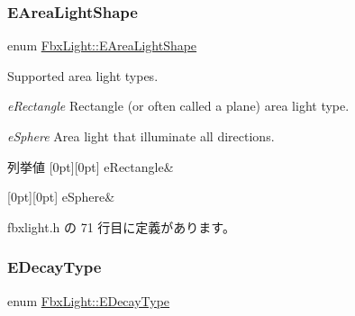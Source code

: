 \subsubsection{\texorpdfstring{E\+Area\+Light\+Shape}{EAreaLightShape}}
{\footnotesize\ttfamily enum \hyperlink{class_fbx_light_a9bc60eabc41255f46f35d1f6acd274cd}{Fbx\+Light\+::\+E\+Area\+Light\+Shape}}

Supported area light types.
\begin{DoxyItemize}
\item {\itshape e\+Rectangle} Rectangle (or often called a plane) area light type.
\item {\itshape e\+Sphere} Area light that illuminate all directions. 
\end{DoxyItemize}\begin{DoxyEnumFields}{列挙値}
[0pt][0pt]{}\mbox{\label{class_fbx_light_a9bc60eabc41255f46f35d1f6acd274cda3ad60ea65faa6a6b1c0a81c5cb014ec9}} 
e\+Rectangle&\\
\hline

[0pt][0pt]{}\mbox{\label{class_fbx_light_a9bc60eabc41255f46f35d1f6acd274cda2e2d016a7ad503ff88a90cc12ded0347}} 
e\+Sphere&\\
\hline

\end{DoxyEnumFields}


 fbxlight.\+h の 71 行目に定義があります。

\mbox{\label{class_fbx_light_a940254a9a826ab44a4cde044db1b3875}} 
\subsubsection{\texorpdfstring{E\+Decay\+Type}{EDecayType}}
{\footnotesize\ttfamily enum \hyperlink{class_fbx_light_a940254a9a826ab44a4cde044db1b3875}{Fbx\+Light\+::\+E\+Decay\+Type}}

